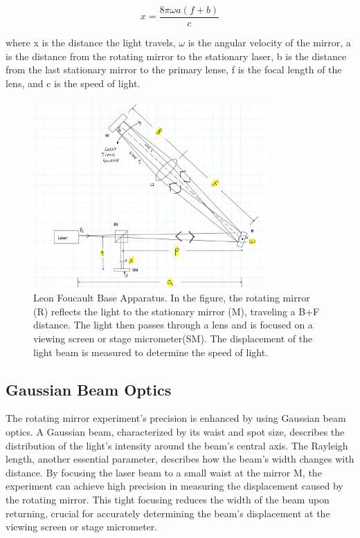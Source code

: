 \documentclass[12pt]{article}
\begin{document}
        \begin{equation}
                x = \frac{ 8 \pi \omega a(f + b)}{c}  
        \end{equation}

        where x is the distance the light travels, $\omega$ is the angular velocity of the mirror,
        a is the distance from the rotating mirror to the stationary laser, b is the distance from
        the last stationary mirror to the primary lense, f is the focal length of the lens, and c is the speed
        of light.

        \begin{figure}[!h]
                \centering
                \includegraphics[width=0.80\textwidth]{../Imgs/base_ap.png}
                \caption{Leon Foucault Base Apparatus. In the figure, the rotating mirror (R)
                reflects the light to the stationary mirror (M), traveling a B+F distance. The light then passes through
                a lens and is focused on a viewing screen or stage micrometer(SM). The displacement of the
                light beam is measured to determine the speed of light.}
                \label{fig: Leon Foucault Base Apparatus}
        \end{figure}
    

        \newpage

        \subsection{Gaussian Beam Optics}
        The rotating mirror experiment's precision is enhanced by using Gaussian beam optics. 
        A Gaussian beam, characterized by its waist and spot size, describes the distribution of 
        the light's intensity around the beam's central axis. The Rayleigh length, another essential 
        parameter, describes how the beam's width changes with distance. By focusing the laser beam 
        to a small waist at the mirror M, the experiment can achieve high precision in measuring 
        the displacement caused by the rotating mirror. This tight focusing reduces the width of the 
        beam upon returning, crucial for accurately determining the beam's displacement at the viewing 
        screen or stage micrometer.
\end{document}
